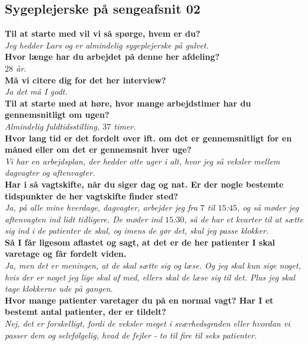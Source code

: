 \subsection{Sygeplejerske på sengeafsnit 02} \label{bilagO2}
\textbf{Til at starte med vil vi så spørge, hvem er du?}\\
\noindent
\textit{Jeg hedder Lars og er almindelig sygeplejerske på gulvet.}\\
\noindent
\textbf{Hvor længe har du arbejdet på denne her afdeling?} \\
\noindent
\textit{$28$ år.}\\
\noindent
\textbf{Må vi citere dig for det her interview?}\\
\noindent
\textit{Ja det må I godt.}\\
\noindent
\textbf{Til at starte med at høre, hvor mange arbejdstimer har du gennemsnitligt om ugen?}\\
\noindent
\textit{Almindelig fuldtidsstilling, $37$ timer.}\\
\noindent
\textbf{Hvor lang tid er det fordelt over ift. om det er gennemsnitligt for en måned eller om det er gennemsnit hver uge?}\\
\noindent
\textit{Vi har en arbejdsplan, der hedder otte uger i alt, hvor jeg så veksler mellem dagvagter og aftenvagter.}\\
\noindent
\textbf{Har i så vagtskifte, når du siger dag og nat. Er der nogle bestemte tidspunkter de her vagtskifte finder sted?}\\
\noindent
\textit{Ja, på alle mine hverdage, dagvagter, arbejder jeg fra $7$ til $15$:$45$, og så møder jeg aftenvagten ind lidt tidligere. De møder ind $15$:$30$, så de har et kvarter til at sætte sig ind i de patienter de skal, og imens de gør det, skal jeg passe klokker.}\\
\noindent
\textbf{Så I får ligesom aflastet og sagt, at det er de her patienter I skal varetage og får fordelt viden.}\\
\noindent
\textit{Ja, men det er meningen, at de skal sætte sig og læse. Og jeg skal kun sige noget, hvis der er noget jeg lige skal af med, ellers skal de læse sig til det. Plus jeg skal tage klokkerne ude på gangen.}\\
\noindent
\textbf{Hvor mange patienter varetager du på en normal vagt? Har I et bestemt antal patienter, der er tildelt?}\\
\noindent
\textit{Nej, det er forskelligt, fordi de veksler meget i sværhedsgraden eller hvordan vi passer dem og selvfølgelig, hvad de fejler - to til fire til seks patienter.}\\

